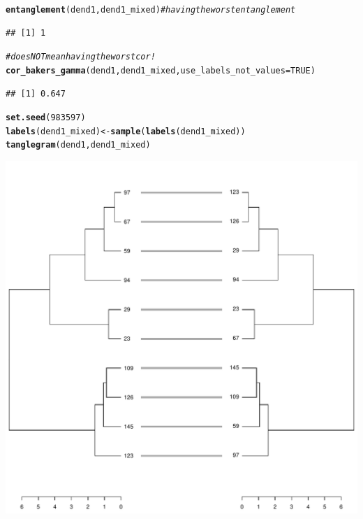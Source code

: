 \documentclass[shortnames,nojss,article]{jss}\usepackage[]{graphicx}\usepackage[]{color}
\makeatletter
\def\maxwidth{ %
  \ifdim\Gin@nat@width>\linewidth
    \linewidth
  \else
    \Gin@nat@width
  \fi
}
\newcommand{\hlnum}[1]{\textcolor[rgb]{0.686,0.059,0.569}{#1}}%
\newcommand{\hlcom}[1]{\textcolor[rgb]{0.678,0.584,0.686}{\textit{#1}}}%
\newcommand{\hlstd}[1]{\textcolor[rgb]{0.345,0.345,0.345}{#1}}%
\newcommand{\hlkwb}[1]{\textcolor[rgb]{0.69,0.353,0.396}{#1}}%
\newcommand{\hlkwc}[1]{\textcolor[rgb]{0.333,0.667,0.333}{#1}}%
\newcommand{\hlkwd}[1]{\textcolor[rgb]{0.737,0.353,0.396}{\textbf{#1}}}%
\newenvironment{kframe}{%
 \def\at@end@of@kframe{}%
 \ifinner\ifhmode%
  \def\at@end@of@kframe{\end{minipage}}%
  \begin{minipage}{\columnwidth}%
 \fi\fi%
 \def\FrameCommand##1{\hskip\@totalleftmargin \hskip-\fboxsep
 \colorbox{shadecolor}{##1}\hskip-\fboxsep
     \hskip-\linewidth \hskip-\@totalleftmargin \hskip\columnwidth}%
 \MakeFramed {\advance\hsize-\width
   \@totalleftmargin\z@ \linewidth\hsize
   \@setminipage}}%
 {\par\unskip\endMakeFramed%
 \at@end@of@kframe}
\newenvironment{knitrout}{}{} %
\makeatother
\begin{document}
\begin{knitrout}
{}


\begin{kframe}\begin{alltt}
\hlkwd{entanglement}\hlstd{(dend1, dend1_mixed)}  \hlcom{# having the worst entanglement }
\end{alltt}
\begin{verbatim}
## [1] 1
\end{verbatim}
\begin{alltt}
\hlcom{# does NOT mean having the worst cor!}
\hlkwd{cor_bakers_gamma}\hlstd{(dend1, dend1_mixed,} \hlkwc{use_labels_not_values} \hlstd{=} \hlnum{TRUE}\hlstd{)}
\end{alltt}
\begin{verbatim}
## [1] 0.647
\end{verbatim}
\begin{alltt}
\hlkwd{set.seed}\hlstd{(}\hlnum{983597}\hlstd{)}
\hlkwd{labels}\hlstd{(dend1_mixed)} \hlkwb{<-} \hlkwd{sample}\hlstd{(}\hlkwd{labels}\hlstd{(dend1_mixed))}
\hlkwd{tanglegram}\hlstd{(dend1, dend1_mixed)}
\end{alltt}
\end{kframe}

{\centering \includegraphics[width=\maxwidth]{figure/cor_bakers_gamma_example_14} 

}



\end{knitrout}
\end{document}

